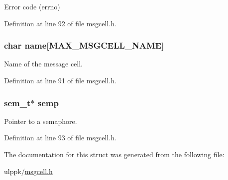 Error code (errno) 



Definition at line 92 of file msgcell.\-h.

\hypertarget{struct___m_s_g_c_e_l_l_a2e4f41af9ce75df9745b48898bf98a83}{
\subsubsection[{name}]{\setlength{\rightskip}{0pt plus 5cm}char name\mbox{[}{\bf M\-A\-X\-\_\-\-M\-S\-G\-C\-E\-L\-L\-\_\-\-N\-A\-M\-E}\mbox{]}}}\label{struct___m_s_g_c_e_l_l_a2e4f41af9ce75df9745b48898bf98a83}


Name of the message cell. 



Definition at line 91 of file msgcell.\-h.

\hypertarget{struct___m_s_g_c_e_l_l_a45cd5bc399af6d5ee57eee563850ebe4}{
\subsubsection[{semp}]{\setlength{\rightskip}{0pt plus 5cm}sem\-\_\-t$\ast$ semp}}\label{struct___m_s_g_c_e_l_l_a45cd5bc399af6d5ee57eee563850ebe4}


Pointer to a semaphore. 



Definition at line 93 of file msgcell.\-h.



The documentation for this struct was generated from the following file\-:\begin{DoxyCompactItemize}
\item 
ulppk/\hyperlink{msgcell_8h}{msgcell.\-h}\end{DoxyCompactItemize}
